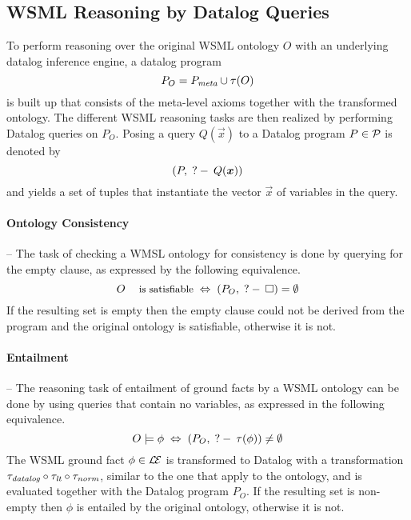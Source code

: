 \subsection{WSML Reasoning by Datalog Queries}

To perform reasoning over the original WSML ontology $O$ with an
underlying datalog inference engine, a datalog program
\begin{displaymath}
    P_O = \mlaxioms \cup \tau(O)
\end{displaymath}
is built up that consists of the meta-level axioms together with
the transformed ontology. The different WSML reasoning tasks are
then realized by performing Datalog queries on $P_O$. Posing a
query $Q(\vec{x})$ to a Datalog program $P \in \P$ is denoted by
$$(P,\qury Q(\vec{x}))$$ and yields a set of tuples that instantiate
the vector $\vec{x}$ of variables in the query.

\paragraph{Ontology Consistency} -- The task of checking a WMSL
ontology for consistency is done by querying for the empty clause,
as expressed by the following equivalence.
\begin{displaymath}
    O \; \textrm{\footnotesize{is satisfiable}} \; \Leftrightarrow \; (P_O , \qury \square) =
    \emptyset
\end{displaymath}
If the resulting set is empty then the empty clause could not be
derived from the program and the original ontology is satisfiable,
otherwise it is not.

\paragraph{Entailment} -- The reasoning task of entailment of
ground facts by a WSML ontology can be done by using queries that
contain no variables, as expressed in the following equivalence.
\begin{displaymath}
    O \models \phi \; \Leftrightarrow \; (P_O, \qury
    \tau(\phi)) \not= \emptyset
\end{displaymath}
The WSML ground fact $\phi \in \LE$ is transformed to Datalog with
a transformation $\transdlog \circ \translt \circ \transnorm$,
similar to the one that apply to the ontology, and is evaluated
together with the Datalog program $P_O$. If the resulting set is
non-empty then $\phi$ is entailed by the original ontology,
otherwise it is not.

